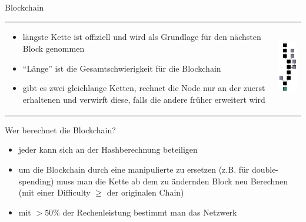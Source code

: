 \documentclass[handout]{beamer} \usepackage[german]{babel}
\begin{document}
\begin{frame}{Blockchain}
	\begin{tabular}{l l}
	\begin{minipage}{0.7\textwidth}
	\begin{itemize}
		\item längste Kette ist offiziell und wird als Grundlage für den nächsten
			Block genommen
		\item	"`Länge"' ist die Gesamtschwierigkeit für die Blockchain
		\item gibt es zwei gleichlange Ketten, rechnet die Node nur an der zuerst
			erhaltenen und verwirft diese, falls die andere früher erweitert wird
	\end{itemize}
	\end{minipage}
	&
	\begin{minipage}{0.3\textwidth}
	\includegraphics[width=20mm]{btcvortrag/Blockchain.png} 
	\end{minipage}
\end{tabular}

\end{frame}

\begin{frame}{Wer berechnet die Blockchain?}
	\begin{itemize}
		\item jeder kann sich an der Hashberechnung beteiligen
		\item um die Blockchain durch eine manipulierte zu ersetzen (z.B. für
			double-spending) muss man die Kette ab dem zu ändernden Block neu
			Berechnen (mit einer Difficulty $\geq $ der originalen Chain)
		\item mit $>50\%$ der Rechenleistung bestimmt man das Netzwerk
	\end{itemize}
\end{frame}
\end{document}
